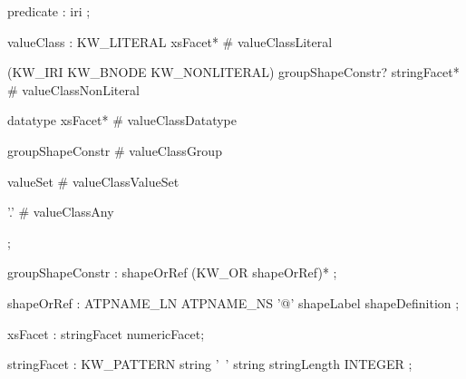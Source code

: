 \documentclass{article}
\def\bnf#1{{\scriptsize {{#1}} }}
\begin{document}
\begin{framed}
\noindent
\bnf{predicate       : iri ;}
\end{framed}


\begin{framed}
\noindent
\bnf{valueClass      : KW\_LITERAL xsFacet*        \# valueClassLiteral}
\end{framed}


\begin{framed}
\noindent
\bnf{                \textbar  (KW\_IRI \textbar  KW\_BNODE \textbar  KW\_NONLITERAL) groupShapeConstr? stringFacet*    \# valueClassNonLiteral}
\end{framed}


\begin{framed}
\noindent
\bnf{                \textbar  datatype xsFacet*           \# valueClassDatatype}
\end{framed}


\begin{framed}
\noindent
\bnf{                \textbar  groupShapeConstr            \# valueClassGroup}
\end{framed}


\begin{framed}
\noindent
\bnf{                \textbar  valueSet                    \# valueClassValueSet}
\end{framed}


\begin{framed}
\noindent
\bnf{                \textbar  '.'                        \# valueClassAny}
\end{framed}


\begin{framed}
\noindent
\bnf{                ;}
\end{framed}


\begin{framed}
\noindent
\bnf{groupShapeConstr : shapeOrRef (KW\_OR shapeOrRef)* ;}
\end{framed}


\begin{framed}
\noindent
\bnf{shapeOrRef      : ATPNAME\_LN \textbar  ATPNAME\_NS \textbar  '@' shapeLabel \textbar  shapeDefinition ;}
\end{framed}


\begin{framed}
\noindent
\bnf{xsFacet         : stringFacet \textbar  numericFacet;}
\end{framed}


\begin{framed}
\noindent
\bnf{stringFacet     : KW\_PATTERN string \textbar  '~' string \textbar  stringLength INTEGER ;}
\end{framed}
\end{document}
